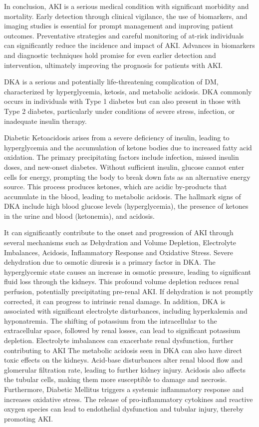 \documentclass[../main.tex]{subfiles}
\begin{document}
In conclusion, \gls{AKI} is a serious medical condition with significant morbidity and mortality. 
Early detection through clinical vigilance, the use of biomarkers, and imaging studies is essential for prompt management and improving patient outcomes. 
Preventative strategies and careful monitoring of at-risk individuals can significantly reduce the incidence and impact of AKI. 
Advances in biomarkers and diagnostic techniques hold promise for even earlier detection and intervention, ultimately improving the prognosis for patients with AKI.


\gls{DKA} is a serious and potentially life-threatening complication of \gls{DM}, characterized by hyperglycemia, ketosis, and metabolic acidosis. 
DKA commonly occurs in individuals with Type 1 diabetes but can also present in those with Type 2 diabetes, particularly under conditions of severe stress, infection, or inadequate insulin therapy. 

Diabetic Ketoacidosis arises from a severe deficiency of insulin, leading to hyperglycemia and the accumulation of ketone bodies due to increased fatty acid oxidation. 
The primary precipitating factors include infection, missed insulin doses, and new-onset diabetes. 
Without sufficient insulin, glucose cannot enter cells for energy, prompting the body to break down fats as an alternative energy source. 
This process produces ketones, which are acidic by-products that accumulate in the blood, leading to metabolic acidosis. 
The hallmark signs of \gls{DKA} include high blood glucose levels (hyperglycemia), the presence of ketones in the urine and blood (ketonemia), and acidosis.

It can significantly contribute to the onset and progression of \gls{AKI} through several mechanisms such as Dehydration and Volume Depletion, Electrolyte Imbalances, Acidosis, Inflammatory Response and Oxidative Stress. 
Severe dehydration due to osmotic diuresis is a primary factor in \gls{DKA}. 
The hyperglycemic state causes an increase in osmotic pressure, leading to significant fluid loss through the kidneys. 
This profound volume depletion reduces renal perfusion, potentially precipitating pre-renal AKI. 
If dehydration is not promptly corrected, it can progress to intrinsic renal damage.
In addition, \gls{DKA} is associated with significant electrolyte disturbances, including hyperkalemia and hyponatremia. 
The shifting of potassium from the intracellular to the extracellular space, followed by renal losses, can lead to significant potassium depletion. 
Electrolyte imbalances can exacerbate renal dysfunction, further contributing to AKI
The metabolic acidosis seen in \gls{DKA} can also have direct toxic effects on the kidneys. 
Acid-base disturbances alter renal blood flow and glomerular filtration rate, leading to further kidney injury. 
Acidosis also affects the tubular cells, making them more susceptible to damage and necrosis.
Furthermore, Diabetic Mellitus triggers a systemic inflammatory response and increases oxidative stress. 
The release of pro-inflammatory cytokines and reactive oxygen species can lead to endothelial dysfunction and tubular injury, thereby promoting AKI.
\end{document}
